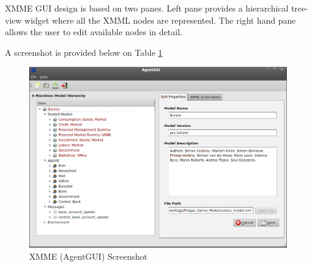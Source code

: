 XMME GUI design is based on two panes. Left pane provides a
hierarchical tree-view widget where all the XMML nodes are
represented. The right hand pane allows the user to edit available
nodes in detail.

A screenshot is provided below on Table \ref{xmmescreen}

\begin{figure}
  \centering
  \includegraphics[width=14cm]{screenshots/xmmescreenshot.png}
  \caption{XMME (AgentGUI) Screenshot}
  \label{xmmescreen}
\end{figure}
